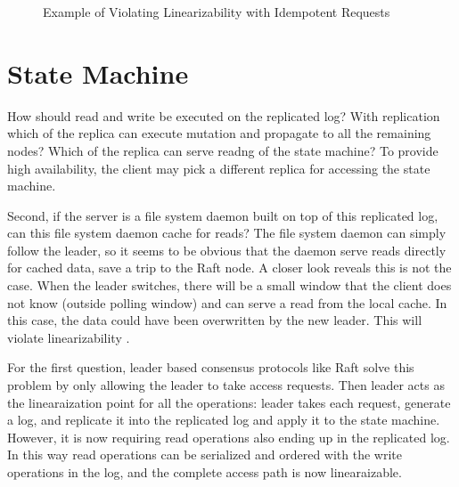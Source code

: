 \begin{figure}
\caption{Example of Violating Linearizability with Idempotent Requests}
\label{fig:M1}
\end{figure}


\section{State Machine \LConsistent}\label{sml}
How should read and write be executed on the replicated log?
With replication which of the replica can execute mutation and propagate to
all the remaining nodes? Which of the replica can serve readng of the state
machine? To provide high availability, the client may pick a different
replica for accessing the state machine.

Second, if the server is a file system daemon built on top of this
replicated log, can this file system daemon cache for reads? The file system
daemon can simply follow the leader, so it seems to be obvious that the
daemon serve reads directly for cached data, save a trip to the Raft node. A
closer look reveals this is not the case. When the leader switches, there
will be a small window that the client does not know (outside polling window)
and can serve a read from the local cache. In this case, the data could have
been overwritten by the new leader. This will violate linearizability .

For the first question, leader based consensus protocols like Raft solve this
problem by only allowing the leader to take access requests. Then leader acts
as the linearaization point for all the operations: leader takes each
request, generate a log, and replicate it into the replicated log and apply
it to the state machine. However, it is now requiring read operations also
ending up in the replicated log. In this way read operations can be
serialized and ordered with the write operations in the log, and the complete
access path is now linearaizable.

